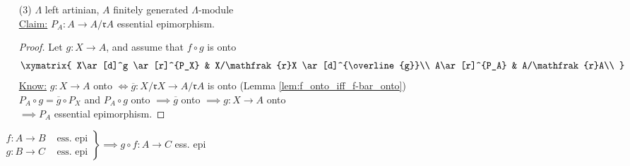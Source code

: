 \begin{defin}
\begin{exam}
\begin{enumerate}
\item[(3)] $\Lambda$ left artinian, $A$ finitely generated $\Lambda$-module\\
\underline{Claim:} $P_A : A \to A / \mathfrak{r}A$ essential epimorphism.
\begin{proof}
Let $g: X \to A$, and assume that $f \circ g$ is onto\\
$$
\xymatrix{
X\ar[d]^g \ar[r]^{P_X} & X/\mathfrak{r}X \ar[d]^{\overline{g}}\\
A\ar[r]^{P_A} & A/\mathfrak{r}A\\
}
$$
\underline{Know:} $g: X \to A$ onto $\iff \overline{g}: X / \mathfrak{r} X \to A / \mathfrak{r}A$ is onto (Lemma \ref{lem:f_onto_iff_f-bar_onto})\\
$P_A \circ g = \overline{g}\circ P_X$ and $P_A \circ g$ onto $\implies \overline{g}$ onto $\implies g:X \to A$ onto \\
$\implies P_A$ essential epimorphism.

\end{proof}

\end{enumerate}
\end{exam}
\end{defin}

\begin{exer}
$\left.
\begin{matrix}
f: A \to B & \text{ ess. epi}\\
g: B \to C & \text{ ess. epi}
\end{matrix}  
\right\rbrace \implies g\circ f : A \to C$ ess. epi
\end{exer}


